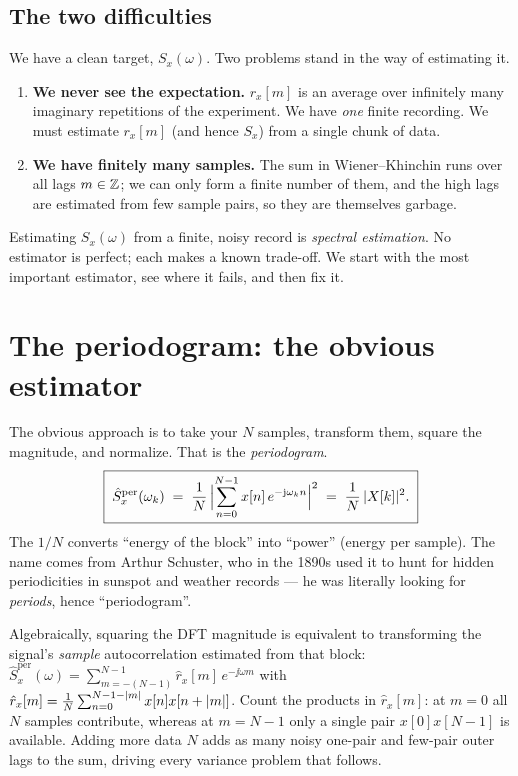 \subsection{The two difficulties}

We have a clean target, $S_x(\omega)$. Two problems stand in the way of
estimating it.

\begin{enumerate}
\item \textbf{We never see the expectation.} $r_x[m]$ is an average over infinitely
many imaginary repetitions of the experiment. We have \emph{one} finite recording.
We must estimate $r_x[m]$ (and hence $S_x$) from a single chunk of data.
\item \textbf{We have finitely many samples.} The sum in Wiener--Khinchin runs over
all lags $m\in\Z$; we can only form a finite number of them, and the high lags are
estimated from few sample pairs, so they are themselves garbage.
\end{enumerate}

Estimating $S_x(\omega)$ from a finite, noisy record is \emph{spectral estimation}.
No estimator is perfect; each makes a known trade-off. We start with the most
important estimator, see where it fails, and then fix it.

\section{The periodogram: the obvious estimator}
\label{ch21:periodogram}

The obvious approach is to take your $N$ samples, transform them, square the
magnitude, and normalize. That is the \emph{periodogram}.
\[
\boxed{\;\hat{S}^{\text{per}}_x(\omega_k) \;=\; \frac{1}{N}\,\abs[\Big]{\sum_{n=0}^{N-1} x[n]\,e^{-\jj \omega_k n}}^{2}
\;=\; \frac{1}{N}\,\abs{X[k]}^2.\;}
\]
The $1/N$ converts ``energy of the block'' into ``power'' (energy per sample). The
name comes from Arthur Schuster, who in the 1890s used it to hunt for hidden
periodicities in sunspot and weather records --- he was literally looking for
\emph{periods}, hence ``periodogram''.

\begin{happeningbox}
Algebraically, squaring the DFT magnitude is equivalent to
transforming the signal's \emph{sample} autocorrelation estimated from that block:
$\hat{S}_x^{\text{per}}(\omega) = \sum_{m=-(N-1)}^{N-1} \hat r_x[m]\,e^{-\jj\omega m}$ with
$\hat r_x[m]=\frac{1}{N}\sum_{n=0}^{N-1-\abs{m}} x[n]x[n+\abs{m}]$. Count the products in $\hat r_x[m]$: at $m=0$ all $N$ samples contribute, whereas at $m = N-1$ only a single pair $x[0]x[N-1]$ is available. Adding more data $N$ adds as many noisy one-pair and few-pair outer lags to the sum, driving every variance problem that follows.
\end{happeningbox}

